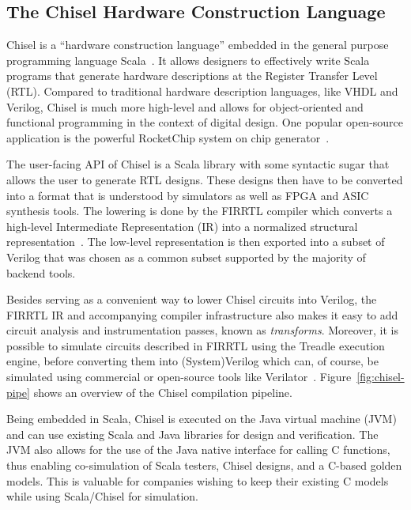 \documentclass[conference]{IEEEtran}
\begin{document}
\subsection{The Chisel Hardware Construction Language}\label{subsec:chisel}

Chisel is a ``hardware construction language'' embedded in the general purpose programming language Scala~\cite{bachrach2012chisel, chisel:book}.
It allows designers to effectively write Scala programs that generate hardware descriptions at the Register Transfer Level (RTL).
Compared to traditional hardware description languages, like 
VHDL and Verilog, Chisel is much more high-level and allows for object-oriented and functional 
programming in the context of digital design.
One popular open-source application is the powerful RocketChip system on chip generator~\cite{rocketchip}.

The user-facing API of Chisel is a Scala library with some syntactic sugar that allows the user to generate RTL designs.
These designs then have to be converted into a format that is understood by simulators as well as FPGA and ASIC synthesis tools.
The lowering is done by the FIRRTL compiler which converts a high-level Intermediate Representation (IR) into a normalized structural representation~\cite{firrtl}.
The low-level representation is then exported into a subset of Verilog that was chosen as a common subset supported by the majority of backend tools.

Besides serving as a convenient way to lower Chisel circuits into Verilog, the FIRRTL IR and accompanying compiler infrastructure
also makes it easy to add circuit analysis and instrumentation passes, known as \textit{transforms}. Moreover, it is possible to simulate circuits described in FIRRTL using the Treadle execution engine, before converting them into (System)Verilog which can, of course, be simulated using commercial or open-source tools like Verilator~\cite{verilator}. Figure~\ref{fig:chisel-pipe} shows an overview of the Chisel compilation pipeline.

Being embedded in Scala, Chisel is executed on the Java virtual machine (JVM) and can
use existing Scala and Java libraries for design and verification. 
The JVM also allows for the use of the Java native interface for calling C functions, 
thus enabling co-simulation of Scala testers, Chisel designs, and a C-based golden models. This is 
valuable for companies wishing to keep their existing C models while using Scala/Chisel for simulation.
\end{document}

